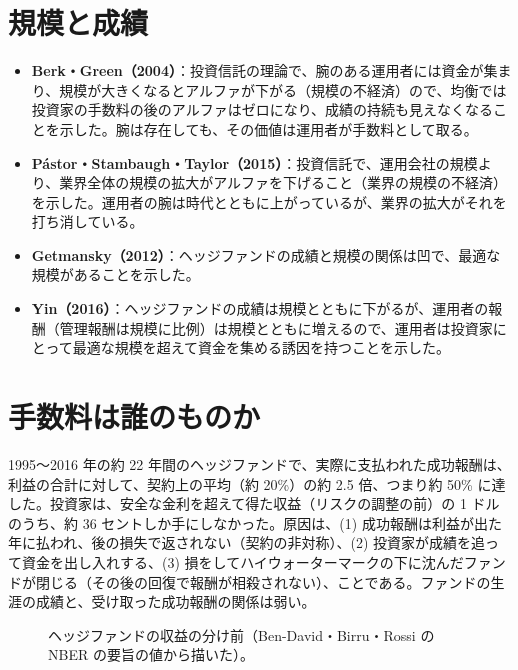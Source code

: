 \section{規模と成績}

\begin{itemize}
\item \textbf{Berk・Green（2004）}\cite{berkgreen2004}：投資信託の理論で、腕のある運用者には資金が集まり、規模が大きくなるとアルファが下がる（規模の不経済）ので、均衡では投資家の手数料の後のアルファはゼロになり、成績の持続も見えなくなることを示した。腕は存在しても、その価値は運用者が手数料として取る。
\item \textbf{Pástor・Stambaugh・Taylor（2015）}\cite{pst2015}：投資信託で、運用会社の規模より、業界全体の規模の拡大がアルファを下げること（業界の規模の不経済）を示した。運用者の腕は時代とともに上がっているが、業界の拡大がそれを打ち消している。
\item \textbf{Getmansky（2012）}\cite{getmansky2012}：ヘッジファンドの成績と規模の関係は凹で、最適な規模があることを示した。
\item \textbf{Yin（2016）}\cite{yin2016}：ヘッジファンドの成績は規模とともに下がるが、運用者の報酬（管理報酬は規模に比例）は規模とともに増えるので、運用者は投資家にとって最適な規模を超えて資金を集める誘因を持つことを示した。
\end{itemize}

\section{手数料は誰のものか}

\begin{paperbox}
1995〜2016 年の約 22 年間のヘッジファンドで、実際に支払われた成功報酬は、利益の合計に対して、契約上の平均（約 20\%）の約 2.5 倍、つまり約 50\% に達した。投資家は、安全な金利を超えて得た収益（リスクの調整の前）の 1 ドルのうち、約 36 セントしか手にしなかった。原因は、(1) 成功報酬は利益が出た年に払われ、後の損失で返されない（契約の非対称）、(2) 投資家が成績を追って資金を出し入れする、(3) 損をしてハイウォーターマークの下に沈んだファンドが閉じる（その後の回復で報酬が相殺されない）、ことである。ファンドの生涯の成績と、受け取った成功報酬の関係は弱い。
\end{paperbox}

\begin{figure}[H]
\centering
{}
\caption{ヘッジファンドの収益の分け前（Ben-David・Birru・Rossi の NBER の要旨の値から描いた）。}
\label{fig:feesplit}
\end{figure}

